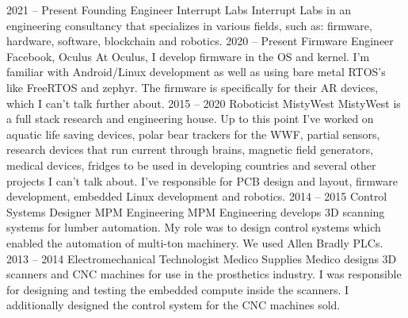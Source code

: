 \documentclass[9pt]{developercv} %
\begin{document}
\begin{entrylist}
    \entry
		{2021 -- Present}
		{Founding Engineer}
		{Interrupt Labs}
        {
        Interrupt Labs in an engineering consultancy that specializes in
        various fields, such as: firmware, hardware, software, blockchain
        and robotics.
        }
	\entry
		{2020 -- Present}
		{Firmware Engineer}
		{Facebook, Oculus}
        {
        At Oculus, I develop firmware in the OS and kernel. I'm familiar with
        Android/Linux development as well as using bare metal RTOS's like
        FreeRTOS and zephyr. The firmware is specifically for their AR devices,
        which I can't talk further about.
        }
	\entry
		{2015 -- 2020}
		{Roboticist}
		{MistyWest}
        {
        MistyWest is a full stack research and engineering house. Up to this
        point I've worked on aquatic life saving devices, polar bear trackers
        for the WWF, partial sensors, research devices that run current through
        brains, magnetic field generators, medical devices, fridges to be used
        in developing countries and several other projects I can't talk about.
        I've responsible for PCB design and layout, firmware development, embedded
        Linux development and robotics.
        }
    \entry
		{2014 -- 2015}
		{Control Systems Designer}
		{MPM Engineering}
		{
        MPM Engineering develops 3D scanning systems for lumber automation. My
        role was to design control systems which enabled the automation of
        multi-ton machinery. We used Allen Bradly PLCs.
        }
	\entry
		{2013 -- 2014}
		{Electromechanical Technologist}
		{Medico Supplies}
		{
        Medico designs 3D scanners and CNC machines for use in the prosthetics
        industry. I was responsible for designing and testing the embedded
        compute inside the scanners. I additionally designed the control system
        for the CNC machines sold.
        }
\end{entrylist}


\end{document}
